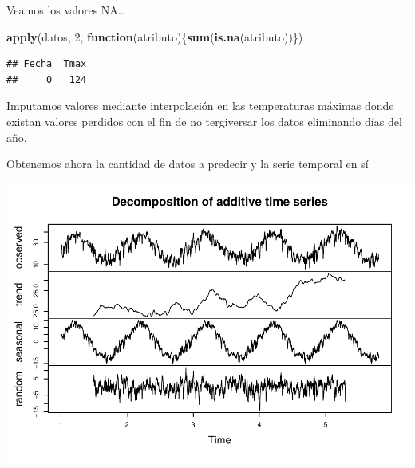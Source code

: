 \documentclass[]{article}
\newenvironment{Shaded}{\begin{snugshade}}{\end{snugshade}}
\newcommand{\KeywordTok}[1]{\textcolor[rgb]{0.13,0.29,0.53}{\textbf{#1}}}
\newcommand{\DataTypeTok}[1]{\textcolor[rgb]{0.13,0.29,0.53}{#1}}
\newcommand{\DecValTok}[1]{\textcolor[rgb]{0.00,0.00,0.81}{#1}}
\newcommand{\StringTok}[1]{\textcolor[rgb]{0.31,0.60,0.02}{#1}}
\newcommand{\CommentTok}[1]{\textcolor[rgb]{0.56,0.35,0.01}{\textit{#1}}}
\newcommand{\ControlFlowTok}[1]{\textcolor[rgb]{0.13,0.29,0.53}{\textbf{#1}}}
\newcommand{\OperatorTok}[1]{\textcolor[rgb]{0.81,0.36,0.00}{\textbf{#1}}}
\newcommand{\NormalTok}[1]{#1}
\begin{document}
Veamos los valores NA\ldots{}

\begin{Shaded}
\begin{Highlighting}[]
\KeywordTok{apply}\NormalTok{(datos, }\DecValTok{2}\NormalTok{, }\ControlFlowTok{function}\NormalTok{(atributo)\{}\KeywordTok{sum}\NormalTok{(}\KeywordTok{is.na}\NormalTok{(atributo))\})}
\end{Highlighting}
\end{Shaded}

\begin{verbatim}
## Fecha  Tmax 
##     0   124
\end{verbatim}

Imputamos valores mediante interpolación en las temperaturas máximas
donde existan valores perdidos con el fin de no tergiversar los datos
eliminando días del año.

\begin{Shaded}
\end{Shaded}

Obtenemos ahora la cantidad de datos a predecir y la serie temporal en
sí

\begin{Shaded}
\end{Shaded}

\includegraphics{timeSeries_files/figure-latex/unnamed-chunk-39-1.pdf}
\end{document}
